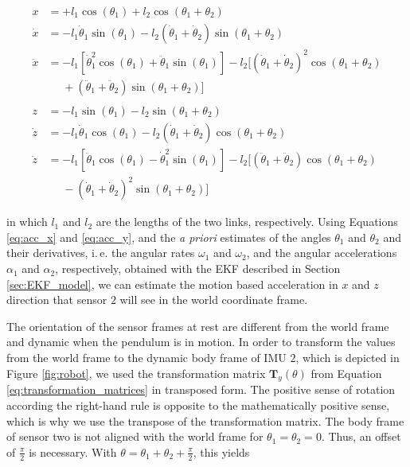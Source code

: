 \begin{align}
  x &= + l_1 \cos(\theta_1) + l_2 \cos(\theta_1 + \theta_2) \\
  \dot{x} &= -l_1 \dot{\theta}_1 \sin(\theta_1) - l_2 (\dot{\theta}_1 + \dot{\theta}_2) \sin(\theta_1 + \theta_2) \\
  \ddot{x} &= -l_1 [\dot{\theta}^2_1 \cos(\theta_1) + \ddot{\theta}_1 \sin(\theta_1)] - l_2 [(\dot{\theta}_1 + \dot{\theta}_2)^2 \cos(\theta_1 + \theta_2) \nonumber \\ 
  &\mathrel{\phantom{=}} + (\ddot{\theta}_1 + \ddot{\theta}_2) \sin(\theta_1 + \theta_2)] \label{eq:acc_x} \\
  \nonumber \\
  z &= -l_1 \sin(\theta_1) - l_2 \sin(\theta_1 + \theta_2) \\
  \dot{z} &= -l_1 \dot{\theta}_1 \cos(\theta_1) - l_2 (\dot{\theta}_1 + \dot{\theta}_2) \cos(\theta_1 + \theta_2) \\
  \ddot{z} {}&= -l_1 [\ddot{\theta}_1 \cos(\theta_1) - \dot{\theta}^2_1 \sin(\theta_1)] - l_2 [(\ddot{\theta}_1 + \ddot{\theta}_2) \cos(\theta_1 + \theta_2) \nonumber \\ 
  &\mathrel{\phantom{=}} - (\dot{\theta}_1 + \dot{\theta}_2)^2 \sin(\theta_1 + \theta_2)] \label{eq:acc_y}
\end{align}

\noindent
in which $l_1$ and $l_2$ are the lengths of the two links, respectively. Using Equations \ref{eq:acc_x} and \ref{eq:acc_y}, and the \emph{a priori} estimates of the angles $\theta_1$ and $\theta_2$ and their derivatives, i.\,e. the angular rates $\omega_1$ and $\omega_2$, and the angular accelerations $\alpha_1$ and $\alpha_2$, respectively, obtained with the EKF described in Section \ref{sec:EKF_model}, we can estimate the motion based acceleration in $x$ and $z$ direction that sensor $2$ will see in the world coordinate frame.

The orientation of the sensor frames at rest are different from the world frame and dynamic when the pendulum is in motion. In order to transform the values from the world frame to the dynamic body frame of \gls{IMU} $2$, which is depicted in Figure \ref{fig:robot}, we used the transformation matrix $\mathbf{T}_y(\theta)$ from Equation \ref{eq:transformation_matrices} in transposed form. The positive sense of rotation according the right-hand rule is opposite to the mathematically positive sense, which is why we use the transpose of the transformation matrix. The body frame of sensor two is not aligned with the world frame for $\theta_1 = \theta_2 = 0$. Thus, an offset of $\frac{\pi}{2}$ is necessary. With $\theta = \theta_1 + \theta_2 + \frac{\pi}{2}$, this yields

